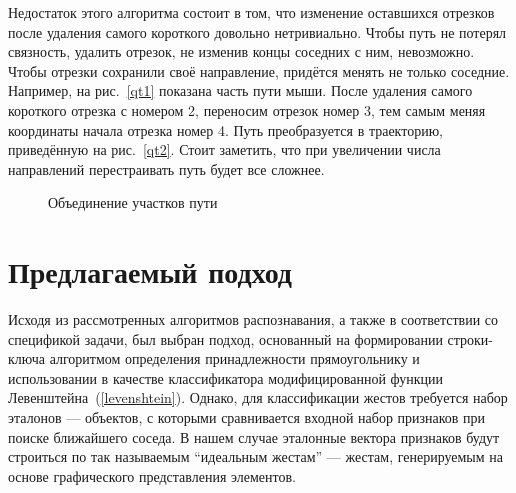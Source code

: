 \documentclass[a5paper]{article}
\begin{document}
Недостаток этого алгоритма состоит в том, что изменение оставшихся отрезков после удаления самого короткого довольно нетривиально. Чтобы путь не потерял связность, удалить отрезок, не изменив концы соседних с ним, невозможно. Чтобы отрезки сохранили своё направление, придётся менять не только соседние. Например, на рис.~\ref{qt1} показана часть пути мыши. После удаления самого короткого отрезка с номером 2, переносим отрезок номер 3, тем самым меняя координаты начала отрезка номер 4. Путь преобразуется в траекторию, приведённую на рис.~\ref{qt2}. Стоит заметить, что при увеличении числа направлений перестраивать путь будет все сложнее. 

\begin{figure} [ht]
  \begin{center}
    \caption{Объединение участков пути}
  \end{center}
\end{figure}

\section{Предлагаемый подход}
\label{rectAlgorithm}
Исходя из рассмотренных алгоритмов распознавания, а также в соответствии со спецификой задачи, был выбран подход, основанный на формировании строки-ключа алгоритмом определения принадлежности прямоугольнику и использовании в качестве классификатора модифицированной функции Левенштейна~(\ref{levenshtein}). Однако, для классификации жестов требуется набор эталонов --- объектов, с которыми сравнивается входной набор признаков при поиске ближайшего соседа. В нашем случае эталонные вектора признаков будут строиться по так называемым ``идеальным жестам'' --- жестам, генерируемым на основе графического представления элементов. 
\end{document}
